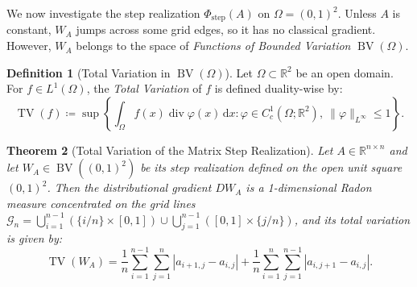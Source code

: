 \documentclass[11pt,a4paper,reqno]{amsart}
\newtheorem{theorem}{Theorem}[section]
\theoremstyle{definition}
\newtheorem{definition}[theorem]{Definition}
\numberwithin{equation}{section}
\newcommand{\R}{\mathbb{R}}
\newcommand{\BV}{\operatorname{BV}}
\newcommand{\TV}{\operatorname{TV}}
\newcommand{\dif}{\,\mathrm{d}}
\begin{document}
We now investigate the step realization $\Phi_{\mathrm{step}}(A)$ on $\Omega = (0, 1)^2$. Unless $A$ is constant, $W_A$ jumps across some grid edges, so it has no classical gradient. However, $W_A$ belongs to the space of \emph{Functions of Bounded Variation} $\BV(\Omega)$.

\begin{definition}[Total Variation in $\BV(\Omega)$]
Let $\Omega \subset \R^2$ be an open domain. For $f \in L^1(\Omega)$, the \emph{Total Variation} of $f$ is defined duality-wise by:
\begin{equation}
    \TV(f) \coloneqq \sup \left\{ \int_\Omega f(x) \operatorname{div} \varphi(x) \dif x \colon \varphi \in C_c^1(\Omega; \R^2), \ \|\varphi\|_{L^\infty} \le 1 \right\}.
\end{equation}
\end{definition}

\begin{theorem}[Total Variation of the Matrix Step Realization]
\label{thm:tv_matrix}
Let $A \in \R^{n \times n}$ and let $W_A \in \BV((0,1)^2)$ be its step realization defined on the open unit square $(0, 1)^2$. Then the distributional gradient $D W_A$ is a 1-dimensional Radon measure concentrated on the grid lines $\mathcal{G}_n = \bigcup_{i=1}^{n-1} (\{i/n\} \times [0,1]) \cup \bigcup_{j=1}^{n-1} ([0,1] \times \{j/n\})$, and its total variation is given by:
\begin{equation}
    \label{eq:tv_formula}
    \TV(W_A) = \frac{1}{n} \sum_{i=1}^{n-1} \sum_{j=1}^n |a_{i+1, j} - a_{i, j}| + \frac{1}{n} \sum_{i=1}^n \sum_{j=1}^{n-1} |a_{i, j+1} - a_{i, j}|.
\end{equation}
\end{theorem}
\end{document}
